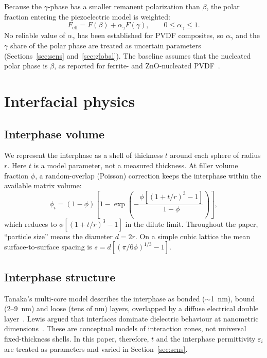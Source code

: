 \documentclass[11pt,a4paper]{article}
\begin{document}
Because the $\gamma$-phase has a smaller remanent polarization than $\beta$, the polar fraction entering the piezoelectric model is weighted:
\begin{equation}
F_{\mathrm{eff}}=F(\beta)+\alpha_\gamma F(\gamma),\qquad 0\le\alpha_\gamma\le1 .
\label{eq:feff}
\end{equation}
No reliable value of $\alpha_\gamma$ has been established for PVDF composites, so $\alpha_\gamma$ and the $\gamma$ share of the polar phase are treated as uncertain parameters (Sections~\ref{sec:sens} and~\ref{sec:global}). The baseline assumes that the nucleated polar phase is $\beta$, as reported for ferrite- and ZnO-nucleated PVDF~\cite{Martins2012,Bagla2025}.

\section{Interfacial physics}

\subsection{Interphase volume}
We represent the interphase as a shell of thickness $t$ around each sphere of radius $r$. Here $t$ is a model parameter, not a measured thickness. At filler volume fraction $\phi$, a random-overlap (Poisson) correction keeps the interphase within the available matrix volume:
\begin{equation}
\phi_i=(1-\phi)\left[1-\exp\!\left(-\frac{\phi\left[(1+t/r)^3-1\right]}{1-\phi}\right)\right],
\label{eq:phii}
\end{equation}
which reduces to $\phi[(1+t/r)^3-1]$ in the dilute limit. Throughout the paper, ``particle size'' means the diameter $d=2r$. On a simple cubic lattice the mean surface-to-surface spacing is $s=d[(\pi/6\phi)^{1/3}-1]$.

\subsection{Interphase structure}
Tanaka's multi-core model describes the interphase as bonded ($\sim$1~nm), bound (2--9~nm) and loose (tens of nm) layers, overlapped by a diffuse electrical double layer~\cite{Tanaka2005}. Lewis argued that interfaces dominate dielectric behaviour at nanometric dimensions~\cite{Lewis2004}. These are conceptual models of interaction zones, not universal fixed-thickness shells. In this paper, therefore, $t$ and the interphase permittivity $\varepsilon_i$ are treated as parameters and varied in Section~\ref{sec:sens}.
\end{document}
